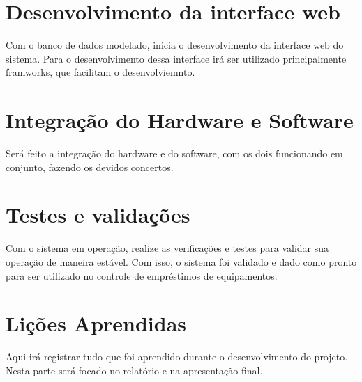 \section[Desenvolvimento da interface web]{Desenvolvimento da interface web}
Com o banco de dados modelado, inicia o desenvolvimento da interface web do sistema. Para o desenvolvimento dessa interface irá ser utilizado principalmente framworks, que facilitam o desenvolviemnto.

\section[Integração do Hardware e Software]{Integração do Hardware e Software}

Será feito a integração do hardware e do software, com os dois funcionando em conjunto, fazendo os devidos concertos.

\section[Testes e validações]{Testes e validações}

Com o sistema em operação, realize as verificações e testes para validar sua operação de maneira estável. Com isso, o sistema foi validado e dado como pronto para ser utilizado no controle de empréstimos de equipamentos.

\section[Lições Aprendidas]{Lições Aprendidas}
Aqui irá registrar tudo que foi aprendido durante o desenvolvimento do projeto. Nesta parte será focado no relatório e na apresentação final.